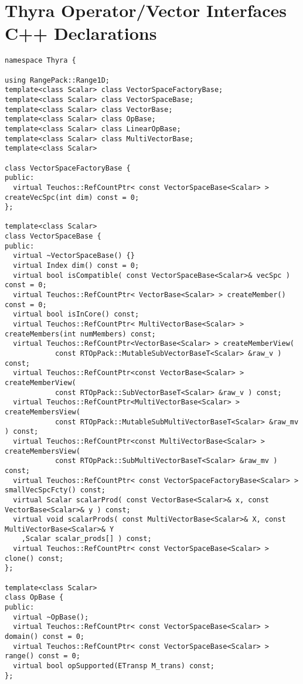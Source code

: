 %
\section{Thyra Operator/Vector Interfaces C++ Declarations}
\label{app:tsfcore_classes}
%

{\scriptsize\begin{verbatim}
namespace Thyra {

using RangePack::Range1D;
template<class Scalar> class VectorSpaceFactoryBase;
template<class Scalar> class VectorSpaceBase;
template<class Scalar> class VectorBase;
template<class Scalar> class OpBase;
template<class Scalar> class LinearOpBase;
template<class Scalar> class MultiVectorBase;
template<class Scalar>

class VectorSpaceFactoryBase {
public:
  virtual Teuchos::RefCountPtr< const VectorSpaceBase<Scalar> > createVecSpc(int dim) const = 0;
};

template<class Scalar>
class VectorSpaceBase {
public:
  virtual ~VectorSpaceBase() {}
  virtual Index dim() const = 0;
  virtual bool isCompatible( const VectorSpaceBase<Scalar>& vecSpc ) const = 0;
  virtual Teuchos::RefCountPtr< VectorBase<Scalar> > createMember() const = 0;
  virtual bool isInCore() const;
  virtual Teuchos::RefCountPtr< MultiVectorBase<Scalar> > createMembers(int numMembers) const;
  virtual Teuchos::RefCountPtr<VectorBase<Scalar> > createMemberView(
            const RTOpPack::MutableSubVectorBaseT<Scalar> &raw_v ) const;
  virtual Teuchos::RefCountPtr<const VectorBase<Scalar> > createMemberView(
            const RTOpPack::SubVectorBaseT<Scalar> &raw_v ) const;
  virtual Teuchos::RefCountPtr<MultiVectorBase<Scalar> > createMembersView(
            const RTOpPack::MutableSubMultiVectorBaseT<Scalar> &raw_mv ) const;
  virtual Teuchos::RefCountPtr<const MultiVectorBase<Scalar> > createMembersView(
            const RTOpPack::SubMultiVectorBaseT<Scalar> &raw_mv ) const;
  virtual Teuchos::RefCountPtr< const VectorSpaceFactoryBase<Scalar> > smallVecSpcFcty() const;
  virtual Scalar scalarProd( const VectorBase<Scalar>& x, const VectorBase<Scalar>& y ) const;
  virtual void scalarProds( const MultiVectorBase<Scalar>& X, const MultiVectorBase<Scalar>& Y
    ,Scalar scalar_prods[] ) const;
  virtual Teuchos::RefCountPtr< const VectorSpaceBase<Scalar> > clone() const;
};

template<class Scalar>
class OpBase {
public:
  virtual ~OpBase();
  virtual Teuchos::RefCountPtr< const VectorSpaceBase<Scalar> > domain() const = 0;
  virtual Teuchos::RefCountPtr< const VectorSpaceBase<Scalar> > range() const = 0;
  virtual bool opSupported(ETransp M_trans) const;
};


\end{verbatim}}

